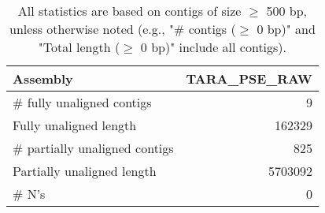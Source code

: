 \documentclass[12pt,a4paper]{article}
\begin{document}
\begin{table}[ht]
\begin{center}
\caption{All statistics are based on contigs of size $\geq$ 500 bp, unless otherwise noted (e.g., "\# contigs ($\geq$ 0 bp)" and "Total length ($\geq$ 0 bp)" include all contigs).}
\begin{tabular}{|l*{1}{|r}|}
\hline
Assembly & TARA\_PSE\_RAW \\ \hline
\# fully unaligned contigs & 9 \\ \hline
Fully unaligned length & 162329 \\ \hline
\# partially unaligned contigs & 825 \\ \hline
Partially unaligned length & 5703092 \\ \hline
\# N's & 0 \\ \hline
\end{tabular}
\end{center}
\end{table}
\end{document}
